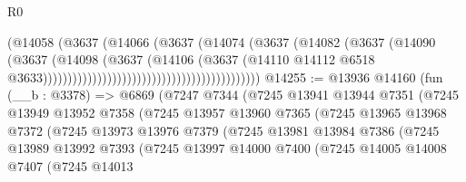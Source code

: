 \begin{lexlean}{R0}
\begin{coremodule}
                                                              (@14058
                                                                (@3637
                                                                  (@14066
                                                                    (@3637
                                                                      (@14074
                                                                        (@3637
                                                                          (@14082
                                                                            (@3637
                                                                              (@14090
                                                                                (@3637
                                                                                  (@14098
                                                                                    (@3637
                                                                                      (@14106
                                                                                        (@3637
                                                                                          (@14110
                                                                                            @14112
                                                                                            @6518
                                                                                            @3633))))))))))))))))))))))))))))))))))))))))))))
@14255 := @13936
    @14160
    (fun (__b : @3378) =>
    @6869
      (@7247
        @7344
        (@7245
          @13941
          @13944
          @7351
          (@7245
            @13949
            @13952
            @7358
            (@7245
              @13957
              @13960
              @7365
              (@7245
                @13965
                @13968
                @7372
                (@7245
                  @13973
                  @13976
                  @7379
                  (@7245
                    @13981
                    @13984
                    @7386
                    (@7245
                      @13989
                      @13992
                      @7393
                      (@7245
                        @13997
                        @14000
                        @7400
                        (@7245
                          @14005
                          @14008
                          @7407
                          (@7245
                            @14013

\end{coremodule}
\end{lexlean}
